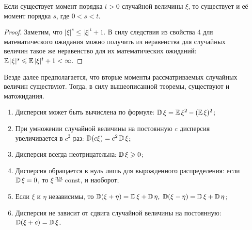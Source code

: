 \begin{thm*}
    Если существует момент порядка $t > 0$ случайной величины $\xi$, то существует и её момент порядка $s$, где $0 < s < t$.
\end{thm*}

\begin{proof} 
Заметим, что $|\xi|^s \leqslant |\xi|^t + 1.$ 
В силу следствия из свойства 4 для математического ожидания можно получить из неравенства для случайных величин такое же неравенство для их математических ожиданий: $\operatorname{\mathbb{E}} |\xi|^s \leqslant \operatorname{\mathbb{E}} |\xi|^t + 1 < \infty.$
\end{proof}

\begin{namedthm}
    Везде далее предполагается, что вторые моменты рассматриваемых случайных величин существуют. Тогда, в силу вышеописанной теоремы, существуют и матожидания.
    \begin{enumerate}
        \item Дисперсия может быть вычислена по формуле: $\operatorname{\mathbb{D}}\xi = \operatorname{\mathbb{E}} \xi^2 - (\operatorname{\mathbb{E}} \xi)^2$;
        \item При умножении случайной величины на постоянную $c$ дисперсия увеличивается в $c^2$ раз: $\operatorname{\mathbb{D}}(c\xi) = c^2\operatorname{\mathbb{D}}\xi$;
        \item Дисперсия всегда неотрицательна: $\operatorname{\mathbb{D}}\xi \geqslant 0$;
        \item Дисперсия обращается в нуль лишь для вырожденного распределения: если $\operatorname{\mathbb{D}}\xi = 0$, то $\xi \overset{\text{п.н.}}{=} \text{const}$, и наоборот;
        \item Если $\xi$ и $\eta$ независимы, то $\operatorname{\mathbb{D}}(\xi + \eta) = \operatorname{\mathbb{D}}\xi + \operatorname{\mathbb{D}}\eta, ~ \operatorname{\mathbb{D}}(\xi-\eta)=\operatorname{\mathbb{D}} \xi+\operatorname{\mathbb{D}} \eta$;
        \item Дисперсия не зависит от сдвига случайной величины на постоянную: $\operatorname{\mathbb{D}}(\xi + c) = \operatorname{\mathbb{D}}\xi$.
    \end{enumerate}
\end{namedthm}

